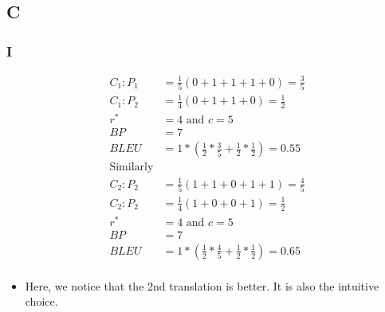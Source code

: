\documentclass[a4paper]{article}
\begin{document}
\subsection{C}
\subsubsection{I}
\begin{equation}
\begin{split}
    C_1:  P_1 &= \frac{1}{5} (0 + 1 + 1 + 1 + 0) = \frac{3}{5} \\
    C_1:  P_2 &= \frac{1}{4} (0 + 1 + 1 + 0) = \frac{1}{2}\\
    r^* &= 4  \text{ and } c = 5 \\
    BP &= 7 \\
    BLEU &= 1 * ( \frac{1}{2} * \frac{3}{5} + \frac{1}{2} * \frac{1}{2}) = 0.55 \\
    \text{Similarly} \\
    C_2:  P_2 &= \frac{1}{5} (1 + 1 + 0 + 1 + 1) = \frac{4}{5} \\
    C_2:  P_2 &= \frac{1}{4} (1 + 0 + 0 + 1) = \frac{1}{2}\\
    r^* &= 4  \text{ and } c = 5 \\
    BP &= 7 \\
    BLEU &= 1 * ( \frac{1}{2} * \frac{4}{5} + \frac{1}{2} * \frac{1}{2}) = 0.65 \\
\end{split}
\end{equation}
\begin{itemize}
    \item Here, we notice that the 2nd translation is better. It is also the intuitive choice.
\end{itemize}
\end{document}

